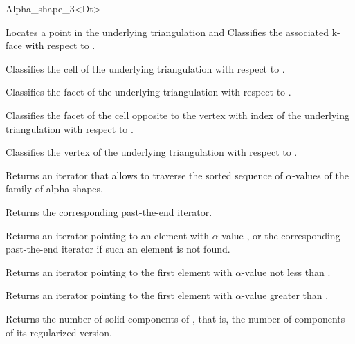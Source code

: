 \begin{ccRefClass} {Alpha_shape_3<Dt>}


{Locates a point   in the underlying triangulation and Classifies the 
associated k-face with respect to \ccVar.}

{Classifies the cell  of the underlying triangulation with respect to \ccVar.}

{Classifies the facet  of the underlying triangulation with respect to \ccVar.}

{Classifies the facet of the cell  opposite to the vertex with index
of the underlying triangulation with respect to \ccVar.}	

{Classifies the vertex  of the underlying triangulation with respect to \ccVar.}



{Returns an iterator that allows to traverse the
sorted sequence of $\alpha$-values of the family of alpha shapes.}

{Returns the corresponding past-the-end iterator.}

{Returns an iterator pointing to an element with $\alpha$-value
, or the corresponding past-the-end iterator if such 
an element is not found.}

{Returns an iterator pointing to the first element with
$\alpha$-value not less than .}

{Returns an iterator pointing to the first element with $\alpha$-value
greater than .}


{Returns the number of solid components of \ccVar, that is, the number of
components of its 
regularized version.}


\end{ccRefClass}

